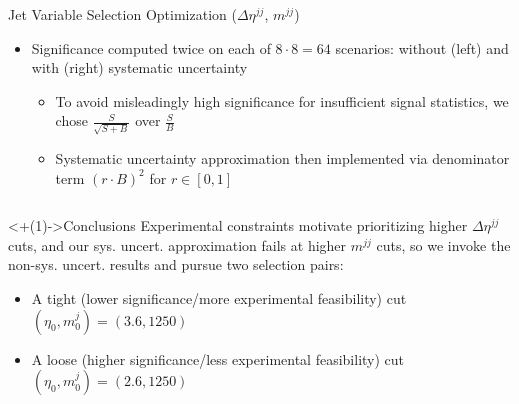 \documentclass[]{beamer}
\begin{document}
\begin{frame}{Jet Variable Selection Optimization ($\Delta \eta^{jj}$, $m^{jj}$)}
\begin{block}
\begin{itemize}[<+(1)->]
            $(\eta_0, m^j_0) \in \{2.6, 3.1, 3.6, 4.1, 4.6, 5.1, 5.6, 6.1\} \times \{120, 500, 750, 1000, 1250, 1500, 1750, 2000\}$
            \item Significance computed twice on each of $8 \cdot 8 = 64$ scenarios: without (left) and with (right) systematic uncertainty
            \begin{itemize}[<+(1)->]
                \item To avoid misleadingly high significance for insufficient signal statistics, we chose $\frac{S}{\sqrt{S + B}}$ over $\frac{S}{B}$ 
                \item Systematic uncertainty approximation then implemented via denominator term $(r \cdot B)^2$ for $r \in [0,1]$
            \end{itemize}
        \end{itemize}
    \end{block}
    \begin{columns}
    \end{columns}
    \begin{block}<+(1)->{Conclusions}
        Experimental constraints motivate prioritizing higher $\Delta \eta^{jj}$ cuts, and our sys. uncert. approximation fails at higher $m^{jj}$ cuts, so we invoke the non-sys. uncert. results and pursue two selection pairs:
        \begin{itemize}[<+(1)->]
            \item A tight (lower significance/more experimental feasibility) cut $(\eta_0, m^j_0) = (3.6, 1250)$
            \item A loose (higher significance/less experimental feasibility) cut $(\eta_0, m^j_0) = (2.6, 1250)$
        \end{itemize} 
    \end{block}
\end{frame}
\end{document}
